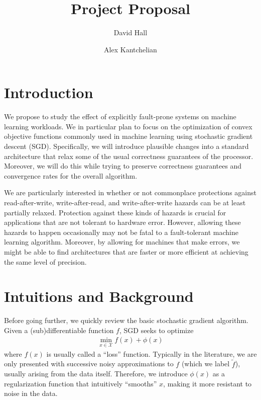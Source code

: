 \documentclass[12pt,leqno,twoside]{article}
\title{Project Proposal}
\author{David Hall \and Alex Kantchelian}
\begin{document}
\maketitle

\section{Introduction}

We propose to study the effect of explicitly fault-prone systems
on machine learning workloads. We in particular plan to focus on the
optimization of convex objective functions commonly used in machine
learning using stochastic gradient descent (SGD). Specifically, we
will introduce plausible changes into a standard architecture that
relax some of the usual correctness guarantees of the processor.
Moreover, we will do this while trying to preserve correctness
guarantees and convergence rates for the overall algorithm. 

We are particularly interested in whether or not commonplace
protections against read-after-write, write-after-read, and
write-after-write hazards can be at least partially relaxed.
Protection against these kinds of hazards is crucial for applications
that are not tolerant to hardware error. However, allowing these
hazards to happen occasionally may not be fatal to a fault-tolerant
machine learning algorithm. Moreover, by allowing for machines
that make errors, we might be able to find architectures that are
faster or more efficient at achieving the same level of precision.


\section{Intuitions and Background}

Before going further, we quickly review the basic stochastic gradient
algorithm. Given a (sub)differentiable function $f$, SGD seeks to
optimize \begin{equation}
  \begin{split}
    \min_{x \in \mathcal{X}} f(x) + \phi(x)
   \end{split}
 \end{equation}
where $f(x)$ is usually called a ``loss'' function.  Typically in
the literature, we are only presented with successive noisy
approximations to $f$ (which we label $\tilde f$), usually arising
from the data itself.  Therefore, we introduce  $\phi(x)$ as a
regularization function that intuitively ``smooths'' $x$, making
it more resistant to noise in the data.
\end{document}
